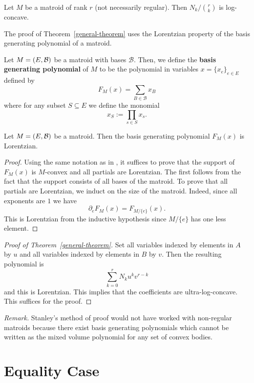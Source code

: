 \documentclass[12pt]{article}
\begin{document}
\begin{thm} \label{general-theorem}
	Let $M$ be a matroid of rank $r$ (not necessarily regular). Then $N_k / \binom{r}{k}$ is log-concave. 
\end{thm}

The proof of Theorem~\ref{general-theorem} uses the Lorentzian property of the basis generating polynomial of a matroid. 

\begin{defn}
	Let $M = (E, \mathcal{B})$ be a matroid with bases $\mathcal{B}$. Then, we define the \textbf{basis generating polynomial} of $M$ to be the polynomial in variables $x = \{x_e\}_{e \in E}$ defined by 
	\[
		F_M(x) = \sum_{B \in \mathcal{B}} x_B
	\]
	where for any subset $S \subseteq E$ we define the monomial
	\[
		x_S := \prod_{s \in S} x_s. 
	\]
\end{defn}

\begin{prop}
	Let $M = (E, \mathcal{B})$ be a matroid. Then the basis generating polynomial $F_M(x)$ is Lorentzian. 
\end{prop}

\begin{proof}
	Using the same notation as in \cite{lorentzian-polynomials}, it suffices to prove that the support of $F_M(x)$ is $M$-convex and all partials are Lorentzian. The first follows from the fact that the support consists of all bases of the matroid. To prove that all partials are Lorentzian, we induct on the size of the matroid. Indeed, since all exponents are $1$ we have 
	\[
		\partial_e F_M(x) = F_{M / \{e\}} (x).
	\]
	This is Lorentzian from the inductive hypothesis since $M / \{e\}$ has one less element. 
\end{proof}

\begin{proof}[Proof of Theorem~\ref{general-theorem}]
	Set all variables indexed by elements in $A$ by $u$ and all variables indexed by elements in $B$ by $v$. Then the resulting polynomial is 
	\[
		\sum_{k = 0}^r N_k u^k v^{r-k}
	\]
	and this is Lorentzian. This implies that the coefficients are ultra-log-concave. This suffices for the proof. 
\end{proof}

\textit{Remark.} Stanley's method of proof would not have worked with non-regular matroids because there exist basis generating polynomials which cannot be written as the mixed volume polynomial for any set of convex bodies.

\section{Equality Case}
\end{document}
